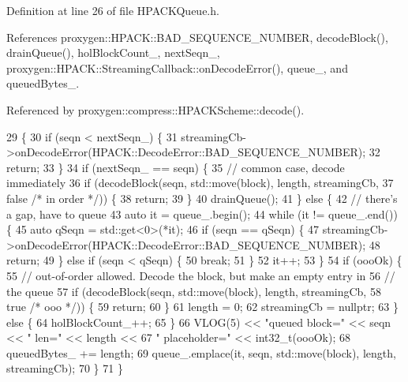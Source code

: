 Definition at line 26 of file H\+P\+A\+C\+K\+Queue.\+h.



References proxygen\+::\+H\+P\+A\+C\+K\+::\+B\+A\+D\+\_\+\+S\+E\+Q\+U\+E\+N\+C\+E\+\_\+\+N\+U\+M\+B\+ER, decode\+Block(), drain\+Queue(), hol\+Block\+Count\+\_\+, next\+Seqn\+\_\+, proxygen\+::\+H\+P\+A\+C\+K\+::\+Streaming\+Callback\+::on\+Decode\+Error(), queue\+\_\+, and queued\+Bytes\+\_\+.



Referenced by proxygen\+::compress\+::\+H\+P\+A\+C\+K\+Scheme\+::decode().


\begin{DoxyCode}
29                                       \{
30     \textcolor{keywordflow}{if} (seqn < nextSeqn_) \{
31       streamingCb->onDecodeError(HPACK::DecodeError::BAD_SEQUENCE_NUMBER);
32       \textcolor{keywordflow}{return};
33     \}
34     \textcolor{keywordflow}{if} (nextSeqn_ == seqn) \{
35       \textcolor{comment}{// common case, decode immediately}
36       \textcolor{keywordflow}{if} (decodeBlock(seqn, std::move(block), length, streamingCb,
37                       \textcolor{keyword}{false} \textcolor{comment}{/* in order */})) \{
38         \textcolor{keywordflow}{return};
39       \}
40       drainQueue();
41     \} \textcolor{keywordflow}{else} \{
42       \textcolor{comment}{// there's a gap, have to queue}
43       \textcolor{keyword}{auto} it = queue_.begin();
44       \textcolor{keywordflow}{while} (it != queue_.end()) \{
45         \textcolor{keyword}{auto} qSeqn = std::get<0>(*it);
46         \textcolor{keywordflow}{if} (seqn == qSeqn) \{
47           streamingCb->onDecodeError(HPACK::DecodeError::BAD_SEQUENCE_NUMBER);
48           \textcolor{keywordflow}{return};
49         \} \textcolor{keywordflow}{else} \textcolor{keywordflow}{if} (seqn < qSeqn) \{
50           \textcolor{keywordflow}{break};
51         \}
52         it++;
53       \}
54       \textcolor{keywordflow}{if} (oooOk) \{
55         \textcolor{comment}{// out-of-order allowed.  Decode the block, but make an empty entry in}
56         \textcolor{comment}{// the queue}
57         \textcolor{keywordflow}{if} (decodeBlock(seqn, std::move(block), length, streamingCb,
58                         \textcolor{keyword}{true} \textcolor{comment}{/* ooo */})) \{
59           \textcolor{keywordflow}{return};
60         \}
61         length = 0;
62         streamingCb = \textcolor{keyword}{nullptr};
63       \} \textcolor{keywordflow}{else} \{
64         holBlockCount_++;
65       \}
66       VLOG(5) << \textcolor{stringliteral}{"queued block="} << seqn << \textcolor{stringliteral}{" len="} << length <<
67         \textcolor{stringliteral}{" placeholder="} << int32\_t(oooOk);
68       queuedBytes_ += length;
69       queue_.emplace(it, seqn, std::move(block), length, streamingCb);
70     \}
71   \}
\end{DoxyCode}
